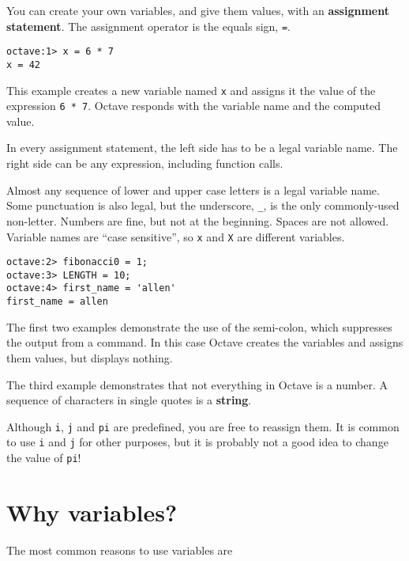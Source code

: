 You can create your own variables, and give them values, with
an {\bf assignment statement}. The assignment operator is the
equals sign, {\tt =}.

\begin{verbatim}
octave:1> x = 6 * 7
x = 42
\end{verbatim}

This example creates a new variable named {\tt x} and assigns it the
value of the expression {\tt 6 * 7}. Octave responds with the
variable name and the computed value.

In every assignment statement, the left side has to be a
legal variable name. The right side can be any expression,
including function calls.

Almost any sequence of lower and upper case letters is a legal
variable name. Some punctuation is also legal, but the underscore,
{\tt \_}, is the only commonly-used non-letter. Numbers are fine, but
not at the beginning. Spaces are not allowed. Variable names are
``case sensitive'', so {\tt x} and {\tt X} are different variables.

\begin{verbatim}
octave:2> fibonacci0 = 1;
octave:3> LENGTH = 10;
octave:4> first_name = 'allen'
first_name = allen
\end{verbatim}

The first two examples demonstrate the use of the semi-colon, which
suppresses the output from a command. In this case Octave creates the
variables and assigns them values, but displays nothing.

The third example demonstrates that not everything
in Octave is a number. A sequence of characters in single quotes is
a {\bf string}.

Although {\tt i}, {\tt j} and {\tt pi} are predefined, you are free
to reassign them. It is common to use {\tt i} and {\tt j} for other
purposes, but it is probably not a good idea to change the value of
{\tt pi}!

\section{Why variables?}

The most common reasons to use variables are

